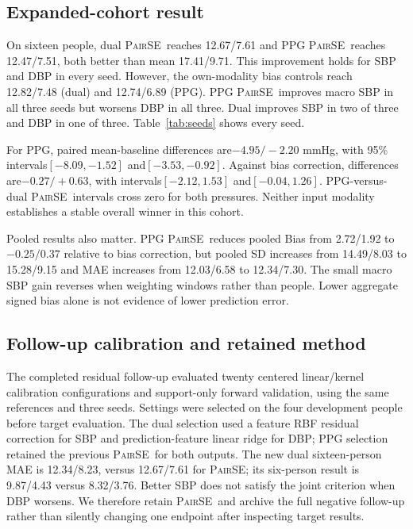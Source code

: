 \documentclass[conference]{IEEEtran}
\newcommand{\pair}{\textsc{PairSE}}
\begin{document}
\subsection{Expanded-cohort result}
On sixteen people, dual \pair\ reaches 12.67/7.61 and PPG \pair\ reaches
12.47/7.51, both better than mean 17.41/9.71. This improvement holds for
SBP and DBP in every seed. However, the own-modality bias controls reach
12.82/7.48 (dual) and 12.74/6.89 (PPG). PPG \pair\ improves macro SBP
in all three seeds but worsens DBP in all three. Dual improves SBP in two
of three and DBP in one of three. Table~\ref{tab:seeds} shows every seed.

For PPG, paired mean-baseline differences are$-4.95/-2.20$ mmHg, with
95\% intervals$[-8.09,-1.52]$ and$[-3.53,-0.92]$. Against bias correction,
differences are$-0.27/+0.63$, with intervals$[-2.12,1.53]$ and$[-0.04,1.26]$.
PPG-versus-dual \pair\ intervals cross zero for both pressures. Neither
input modality establishes a stable overall winner in this cohort.

Pooled results also matter. PPG \pair\ reduces pooled Bias from 2.72/1.92
to$-0.25/0.37$ relative to bias correction, but pooled SD increases from
14.49/8.03 to 15.28/9.15 and MAE increases from 12.03/6.58 to 12.34/7.30.
The small macro SBP gain reverses when weighting windows rather than people.
Lower aggregate signed bias alone is not evidence of lower prediction error.

\subsection{Follow-up calibration and retained method}
The completed residual follow-up evaluated twenty centered linear/kernel
calibration configurations and support-only forward validation, using the
same references and three seeds. Settings were selected on the four
development people before target evaluation. The dual selection used a
feature RBF residual correction for SBP and prediction-feature linear ridge
for DBP; PPG selection retained the previous \pair\ for both outputs.
The new dual sixteen-person MAE is 12.34/8.23, versus 12.67/7.61 for \pair;
its six-person result is 9.87/4.43 versus 8.32/3.76. Better SBP does not
satisfy the joint criterion when DBP worsens. We therefore retain \pair\ and
archive the full negative follow-up rather than silently changing one
endpoint after inspecting target results.
\end{document}

